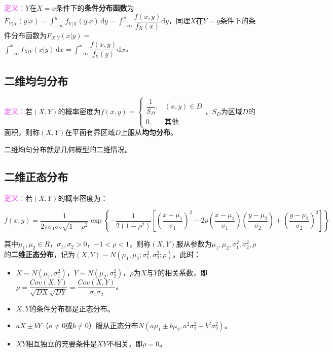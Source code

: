 \textcolor{violet}{\textbf{定义：}}$Y$在$X=x$条件下的\textbf{条件分布函数}为$F_{Y|X}(y|x)=\int_{-\infty}^yf_{Y|X}(y|x)\,\textrm{d}y=\displaystyle{\int_{-\infty}^y\dfrac{f(x,y)}{f_X(x)}\textrm{d}y}$，同理$X$在$Y=y$条件下的条件分布函数为$F_{X|Y}(x|y)=$\\$\int_{-\infty}^xf_{X|Y}(x|y)\,\textrm{d}x=\displaystyle{\int_{-\infty}^x\dfrac{f(x,y)}{f_Y(y)}}\textrm{d}x$。

\subsection{二维均匀分布}

\textcolor{violet}{\textbf{定义：}}若$(X,Y)$的概率密度为$f(x,y)=\left\{\begin{array}{ll}
    \dfrac{1}{S_D}, & (x,y)\in D \\
    0, & \text{其他}
\end{array}\right.$，$S_D$为区域$D$的面积，则称$(X,Y)$在平面有界区域$D$上服从\textbf{均匀分布}。

二维均匀分布就是几何概型的二维情况。

\subsection{二维正态分布}

\textcolor{violet}{\textbf{定义：}}若$(X,Y)$的概率密度为：

{\fontsize{8.2pt}{10pt}$f(x,y)=\dfrac{1}{2\pi\sigma_1\sigma_2\sqrt{1-\rho^2}}\exp\left\{-\dfrac{1}{2(1-\rho^2)}\left[\left(\dfrac{x-\mu_1}{\sigma_1}\right)^2-2\rho\left(\dfrac{x-\mu_1}{\sigma_1}\right)\left(\dfrac{y-\mu_2}{\sigma_2}\right)+\left(\dfrac{y-\mu_2}{\sigma_2}\right)^2\right]\right\}$}

其中$\mu_1,\mu_2\in R$，$\sigma_1,\sigma_2>0$，$-1<\rho<1$，则称$(X,Y)$服从参数为$\mu_1,\mu_2,\sigma_1^2,\sigma_2^2,\rho$的\textbf{二维正态分布}，记为$(X,Y)\sim N(\mu_1,\mu_2;\sigma_1^2,\sigma_2^2;\rho)$。此时：

\begin{itemize}
    \item $X\sim N(\mu_1,\sigma_1^2)$，$Y\sim N(\mu_2,\sigma_2^2)$，$\rho$为$X$与$Y$的相关系数，即$\rho=\dfrac{Cov(X,Y)}{\sqrt{DX}\sqrt{DY}}=\dfrac{Cov(X,Y)}{\sigma_1\sigma_2}$。
    \item $X,Y$的条件分布都是正态分布。
    \item $aX\pm bY$（$a\neq0$或$b\neq0$）服从正态分布$N(a\mu_1\pm b\mu_2,a^2\sigma_1^2+b^2\sigma_2^2)$。
    \item $XY$相互独立的充要条件是$XY$不相关，即$\rho=0$。
\end{itemize}


